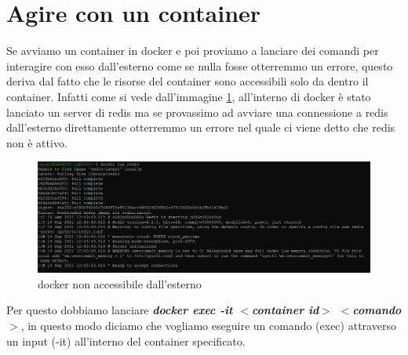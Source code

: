 \documentclass[11pt,a4paper]{book}
\begin{document}
\section{Agire con un container}
Se avviamo un container in docker e poi proviamo a lanciare dei comandi per interagire con esso dall'esterno come se nulla fosse otterremmo un errore, questo deriva dal fatto che le risorse del container sono accessibili solo da dentro il container. Infatti come si vede dall'immagine \ref{fig: 006}, all'interno di docker è stato lanciato un server di redis ma se provassimo ad avviare una connessione a redis dall'esterno direttamente otterremmo un errore nel quale ci viene detto che redis non è attivo.
\begin{figure}[h!]
	\begin{center}
		\includegraphics[scale=0.6]{img/006.jpg}
		\caption{docker non accessibile dall'esterno}
		\label{fig: 006}
	\end{center}
\end{figure}

Per questo dobbiamo lanciare \emph\textbf{{docker exec -it $<$container id$>$ $<$comando$>$}}, in questo modo diciamo che vogliamo eseguire un comando (exec) attraverso un input (-it) all'interno del container specificato.
\end{document}
